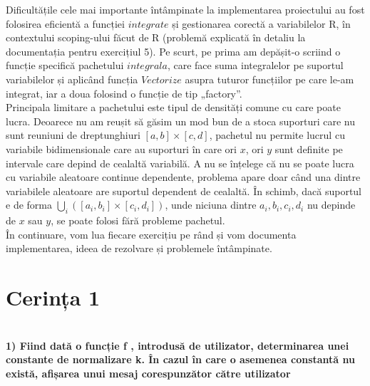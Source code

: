 \documentclass[12pt]{article}
\begin{document}
\indent Dificultățile cele mai importante întâmpinate la implementarea proiectului au fost folosirea eficientă a funcției $integrate$ și gestionarea corectă a variabilelor R, în contextului scoping-ului făcut de R (problemă explicată în detaliu la documentația pentru exercițiul 5). Pe scurt, pe prima am depășit-o scriind o funcție specifică pachetului $integrala$, care face suma integralelor pe suportul variabilelor și aplicând funcția $Vectorize$ asupra tuturor funcțiilor pe care le-am integrat, iar a doua folosind o funcție de tip „factory”. \\
\indent Principala limitare a pachetului este tipul de densități comune cu care poate lucra. Deoarece nu am reușit să găsim un mod bun de a stoca suporturi care nu sunt reuniuni de dreptunghiuri $[a, b] \times [c, d]$, pachetul nu permite lucrul cu variabile bidimensionale care au suporturi în care ori $x$, ori $y$ sunt definite pe intervale care depind de cealaltă variabilă. A nu se înțelege că nu se poate lucra cu variabile aleatoare continue dependente, problema apare doar când una dintre variabilele aleatoare are suportul dependent de cealaltă. În schimb, dacă suportul e de forma $\displaystyle \bigcup\limits_{i} ([a_i, b_i] \times [c_i, d_i])$, unde niciuna dintre $a_i, b_i, c_i, d_i$ nu depinde de $x$ sau $y$, se poate folosi fără probleme pachetul. \\
\indent În continuare, vom lua fiecare exercițiu pe rând și vom documenta implementarea, ideea de rezolvare și problemele întâmpinate. \\

\section{Cerința 1}	\hfill \\
\indent \textbf{1) Fiind dată o funcție f , introdusă de utilizator, determinarea unei constante de
	normalizare k. În cazul în care o asemenea constantă nu există, afișarea unui mesaj
	corespunzător către utilizator}\vspace{5mm}
\end{document}
